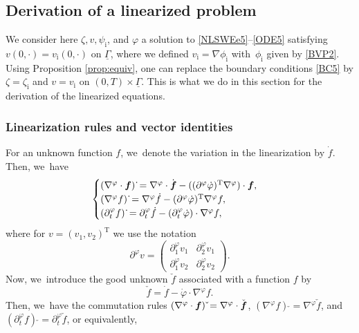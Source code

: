 \documentclass[10pt]{amsart}
\newcommand{\dt}{\partial_t}
\newcommand{\ul}[1]{\underline{#1}}
\newcommand{\itGamma}{\mathit{\Gamma}}
\theoremstyle{definition}
\begin{document}
\subsection{Derivation of a linearized problem}\label{subsect:DLP}
We consider here $\zeta,v,\psi_\mathrm{i}$, and $\varphi$ a solution to \eqref{NLSWEe5}--\eqref{ODE5} satisfying $v(0,\cdot)=v_\mathrm{i}(0,\cdot)$ on $\ul{\itGamma}$,
where we defined $v_\mathrm{i}=\nabla \phi_\mathrm{i}$ with~$\phi_\mathrm{i}$ given by \eqref{BVP2}.
Using Proposition \ref{prop:equiv}, one can replace the boundary conditions \eqref{BC5} by $\zeta=\zeta_\mathrm{i}$ and $v=v_\mathrm{i}$ on $(0,T)\times\ul{\itGamma}$.
This is what we do in this section for the derivation of the linearized equations.

\subsubsection{Linearization rules and vector identities}
For an unknown function $f$, we~denote the variation in the linearization by $\dot{f}$.
Then, we~have
\begin{equation}\label{linearization 1}
\begin{cases}
(\nabla^\varphi \cdot \mbox{\boldmath$f$})\,\dot{}
= \nabla^\varphi \cdot \dot{\mbox{\boldmath$f$}}
- ((\partial^\varphi \dot{\varphi})^\mathrm{T}\nabla^\varphi) \cdot \mbox{\boldmath$f$}, \\
(\nabla^\varphi f)\,\dot{}
= \nabla^\varphi \dot{f} - (\partial^\varphi \dot{\varphi})^\mathrm{T}\nabla^\varphi f, \\
(\dt^\varphi f)\,\dot{}
= \dt^\varphi\dot{f} - (\dt^\varphi\dot{\varphi}) \cdot \nabla^\varphi f,
\end{cases}
\end{equation}
where for $v = (v_1,v_2)^\mathrm{T}$ we use the notation
\[
\partial^\varphi v =
\begin{pmatrix}
\partial_1^\varphi v_1 & \partial_2^\varphi v_1 \\
\partial_1^\varphi v_2 & \partial_2^\varphi v_2
\end{pmatrix}.
\]
Now, we~introduce the good unknown $\check{f}$ associated with a function $f$ by
\begin{equation}\label{GoodUnknown}
\check{f} = \dot{f} - \dot{\varphi} \cdot \nabla^\varphi f.
\end{equation}
Then, we~have the commutation rules $(\nabla^\varphi\cdot \mbox{\boldmath$f$})\,\check{} =\nabla^\varphi\cdot \check{\mbox{\boldmath$f$}}$,
$(\nabla^\varphi f)\,\check{} =\nabla^\varphi \check{f}$, and $(\dt^\varphi f)\,\check{} =\dt^\varphi \check{f}$, or equivalently,
\end{document}
